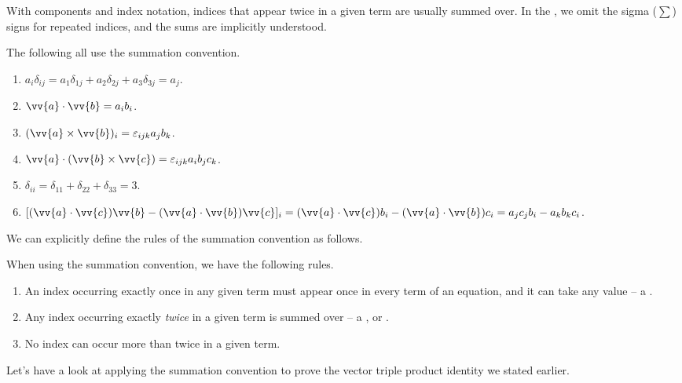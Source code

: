 With components and index notation, indices that appear twice in a given term are usually summed over. In the , we omit the sigma ($\sum$) signs for repeated indices, and the sums are implicitly understood.

\begin{example}
    The following all use the summation convention.
    \begin{enumerate}[label=(\roman*)]
        \item $a_i \delta_{ij} = a_1 \delta_{1j} + a_2 \delta_{2j} + a_3\delta_{3j} = a_j$.
        \item $\vv{a} \cdot \vv{b} = a_i b_i$.
        \item $(\vv{a} \times \vv{b})_i= \varepsilon_{ijk}a_j b_k$.
        \item $\vv{a} \cdot (\vv{b} \times \vv{c}) = \varepsilon_{ijk} a_i b_j c_k$.
        \item $\delta_{ii} = \delta_{11} + \delta_{22} + \delta_{33} = 3$.
        \item $[(\vv{a} \cdot \vv{c})\vv{b} - (\vv{a} \cdot \vv{b})\vv{c}]_i = (\vv{a} \cdot \vv{c})b_i - (\vv{a} \cdot \vv{b})c_i = a_j c_j b_i - a_k b_k c_i$.
    \end{enumerate}
\end{example}

We can explicitly define the rules of the summation convention as follows.

\begin{definition}
    When using the summation convention, we have the following rules.
    \begin{enumerate}[label=(\roman*)]
        \item An index occurring exactly once in any given term must appear once in every term of an equation, and it can take any value -- a .
        \item Any index occurring exactly \emph{twice} in a given term is summed over -- a ,  or .
        \item No index can occur more than twice in a given term.
    \end{enumerate}
\end{definition}

Let's have a look at applying the summation convention to prove the vector triple product identity we stated earlier.


